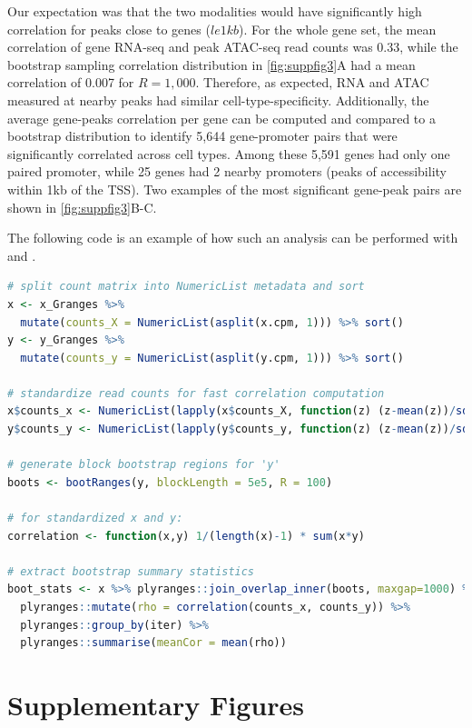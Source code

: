 \documentclass{article}
\begin{document}
Our expectation was that the two modalities would have
significantly high correlation for peaks close to genes ($le 1kb$).
For the whole gene set, the mean
correlation of gene RNA-seq and peak ATAC-seq read counts was 0.33, while the
bootstrap sampling correlation distribution in \cref{fig:suppfig3}A
had a mean correlation of 0.007 for $R = 1,000$.
Therefore, as expected, RNA and ATAC
measured at nearby peaks had similar cell-type-specificity.
Additionally, the average gene-peaks correlation per gene can be
computed and compared to a bootstrap distribution to identify 5,644
gene-promoter pairs that were significantly correlated across cell
types. Among these 5,591 genes had only one paired promoter, while 25
genes had 2 nearby promoters (peaks of accessibility within 1kb of the
TSS). 
Two examples of the most significant gene-peak pairs are shown in
\cref{fig:suppfig3}B-C.

The following code is an example of how such an analysis can be
performed with \bootranges and \plyranges. 

\begin{lstlisting}[language=R]
# split count matrix into NumericList metadata and sort
x <- x_Granges %>%
  mutate(counts_X = NumericList(asplit(x.cpm, 1))) %>% sort()
y <- y_Granges %>%
  mutate(counts_y = NumericList(asplit(y.cpm, 1))) %>% sort()

# standardize read counts for fast correlation computation
x$counts_x <- NumericList(lapply(x$counts_X, function(z) (z-mean(z))/sd(z)))
y$counts_y <- NumericList(lapply(y$counts_y, function(z) (z-mean(z))/sd(z)))

# generate block bootstrap regions for 'y'
boots <- bootRanges(y, blockLength = 5e5, R = 100)

# for standardized x and y:
correlation <- function(x,y) 1/(length(x)-1) * sum(x*y)

# extract bootstrap summary statistics
boot_stats <- x %>% plyranges::join_overlap_inner(boots, maxgap=1000) %>%
  plyranges::mutate(rho = correlation(counts_x, counts_y)) %>%
  plyranges::group_by(iter) %>%
  plyranges::summarise(meanCor = mean(rho)) 
\end{lstlisting} 
 
\newpage

\section{Supplementary Figures}
\end{document}
